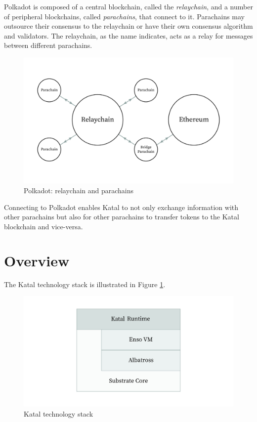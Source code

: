 \documentclass[conference]{IEEEtran}
\begin{document}
Polkadot is composed of a central blockchain, called the \textit{relaychain}, and a number of peripheral blockchains, called \textit{parachains}, that connect to it. Parachains may outsource their consensus to the relaychain or have their own consensus algorithm and validators. The relaychain, as the name indicates, acts as a relay for messages between different parachains.

\begin{figure}[h]
	\includegraphics[width=\linewidth]{images/polkadot.jpg}
	\caption{Polkadot: relaychain and parachains}
\end{figure}

Connecting to Polkadot enables Katal to not only exchange information with other parachains but also for other parachains to transfer tokens to the Katal blockchain and vice-versa.

\section{Overview}
The Katal technology stack is illustrated in Figure \ref{fig:stack}.

\begin{figure}[h]
	\includegraphics[width=\linewidth]{images/XTL_stack.jpg}
	\caption{Katal technology stack}
	\label{fig:stack}
\end{figure}
\end{document}

